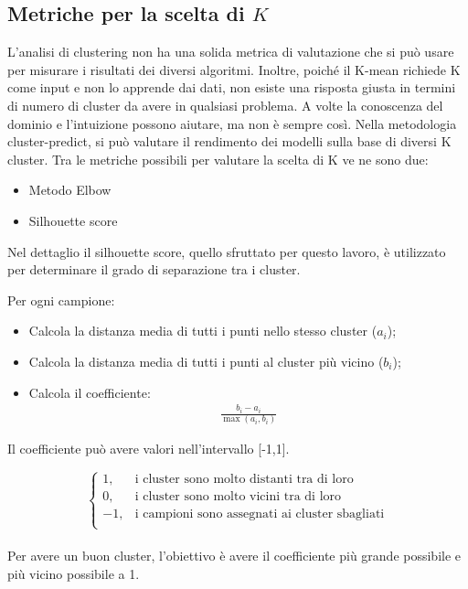 \subsection{Metriche per la scelta di $K$}

L'analisi di clustering non ha una solida metrica di valutazione che si può usare per misurare i risultati dei diversi algoritmi. Inoltre, poiché il K-mean richiede K come input e non lo apprende dai dati, non esiste una risposta giusta in termini di numero di cluster da avere in qualsiasi problema. 
A volte la conoscenza del dominio e l'intuizione possono aiutare, ma non è sempre così. Nella metodologia cluster-predict, si può valutare il rendimento dei modelli sulla base di diversi K cluster.
Tra le metriche possibili per valutare la scelta di K ve ne sono due:
\begin{itemize}
	\item Metodo Elbow
	\item Silhouette score
\end{itemize}
 
Nel dettaglio il silhouette score, quello sfruttato per questo lavoro, è utilizzato per determinare il grado di separazione tra i cluster.

Per ogni campione:
\begin{itemize}
	\item Calcola la distanza media di tutti i punti nello stesso cluster ($a_i$);
	\item Calcola la distanza media di tutti i punti al cluster più vicino ($b_i$);
	\item Calcola il coefficiente:
	\begin{align*}
		 \frac{b_i - a_i}{\max(a_i,b_i)}
	\end{align*}
\end{itemize}

Il coefficiente può avere valori nell'intervallo [-1,1]. 

$$\left \{
	\begin{array}{lc}
		1, & \text{i cluster sono molto distanti tra di loro}\\
		 0,  & \text{i cluster sono molto vicini tra di loro}\\
	   -1, & \text{i campioni sono assegnati ai cluster sbagliati}\\
	\end{array}
\right.
$$
\\
Per avere un buon cluster, l'obiettivo è avere il coefficiente più grande possibile e più vicino possibile a 1.

